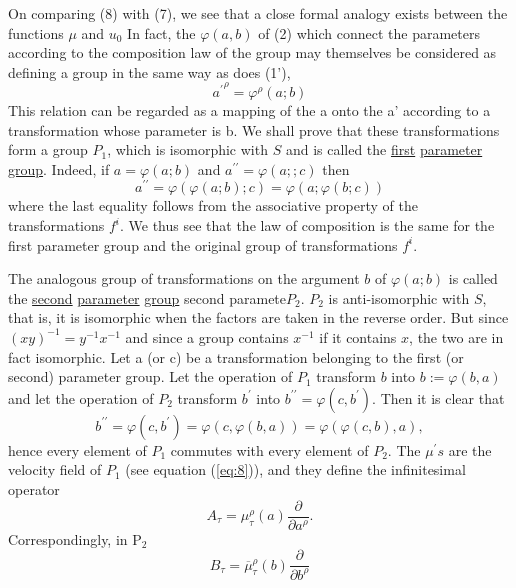 On comparing (8) with (7), we see that a close formal analogy exists between
the functions \(\mu\) and \(u_0\) In fact, the \(\varphi(a, b)\) of (2) which
connect the parameters according to the composition law of the group may
themselves be considered as defining a group in the same way as does (1'),
\[
{a^{\prime}}^{\rho}=\varphi^{\rho}(a ; b)
\]
This relation can be regarded as a mapping of the a onto the a' according to a
transformation whose parameter is b. We shall prove that these transformations
form a group \(P_1\), which is isomorphic with \(S\) and is called the \underline{first}
\underline{parameter} \underline{group}. Indeed, if \(a=\varphi(a ; b)\) and \(a^{\prime
\prime}=\varphi(a ; ; c)\) then
\[
a^{\prime \prime}=\varphi(\varphi(a ; b) ; c)=\varphi(a ; \varphi(b ; c))
\]
where the last equality follows from the associative property of the
transformations \(f^i\). We thus see that the law of composition is the same
for the first parameter group and the original group of transformations \(f^i\).

The analogous group of transformations on the argument \(b\) of \(\varphi(a ;
b)\) is called the \underline{second} \underline{parameter} \underline{group}
second paramete\(P_2\). \(P_2\) is anti-isomorphic with \(S\),
that is, it is isomorphic when the factors are taken in the reverse
order. But since \((x y)^{-1}=y^{-1} x^{-1}\) and since a group contains
\(x^{-1}\) if it contains \(x\), the two are in fact isomorphic. Let a (or c)
be a transformation belonging to the first (or second) parameter group. Let the
operation of \(P_1\) transform \(b\) into \(b:=\varphi(b, a)\) and let the
operation of \(P_2\) transform \(b^{\prime}\) into
\(b^{\prime \prime}=\varphi\left(c, b^{\prime}\right)\). Then it is clear that
\[
b^{\prime \prime}=\varphi\left(c, b^{\prime}\right)=
\varphi(c, \varphi(b, a))=\varphi(\varphi(c, b), a),
\]
hence every element of \(P_1\) commutes with every element of \(P_2\).
The \(\mu^{\prime} s\) are the velocity field of \(P_1\) (see equation (\ref{eq:8})),
and they define the infinitesimal operator
\begin{equation}\label{eq:15}
A_\tau=\mu_\tau^{\rho} (a) \frac{\partial}{\partial a^{\rho}} .
\end{equation}
Correspondingly, in \(\mathrm{P}_2\)
\begin{equation}\label{eq:16}
B_\tau={\overline{\mu}}^{\rho}_{\tau} (b) \frac{\partial}{\partial b^{\rho}}
\end{equation}

